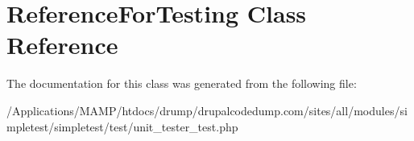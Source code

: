 \hypertarget{class_reference_for_testing}{
\section{ReferenceForTesting Class Reference}
\label{class_reference_for_testing}
}


The documentation for this class was generated from the following file:\begin{DoxyCompactItemize}
\item 
/Applications/MAMP/htdocs/drump/drupalcodedump.com/sites/all/modules/simpletest/simpletest/test/unit\_\-tester\_\-test.php\end{DoxyCompactItemize}
